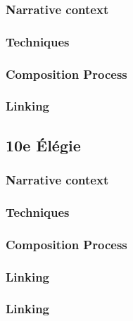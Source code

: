 \documentclass[12pt,twoside,maitrise]{dms}
\theoremstyle{definition}
\numberwithin{equation}{section}
\numberwithin{table}{chapter}
\numberwithin{figure}{chapter}
\begin{document}
\subsubsection{Narrative context}

\subsubsection{Techniques}

\subsubsection{Composition Process}

\subsubsection{Linking}

\subsection{10e Élégie}

\subsubsection{Narrative context}

\subsubsection{Techniques}

\subsubsection{Composition Process}

\subsubsection{Linking}

\subsubsection{Linking}




\end{document}

